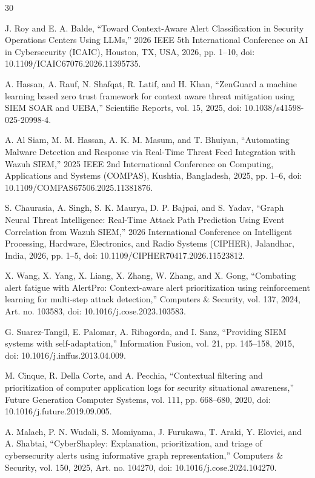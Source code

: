 \documentclass[conference]{IEEEtran}
\begin{document}
\begin{thebibliography}{30}
\scriptsize
\setlength{\itemsep}{0pt}
\setlength{\parskip}{0pt}
\setlength{\parsep}{0pt}

 J. Roy and E. A. Balde, ``Toward Context-Aware Alert Classification in Security Operations Centers Using LLMs,'' 2026 IEEE 5th International Conference on AI in Cybersecurity (ICAIC), Houston, TX, USA, 2026, pp. 1--10, doi: 10.1109/ICAIC67076.2026.11395735.

 A. Hassan, A. Rauf, N. Shafqat, R. Latif, and H. Khan, ``ZenGuard a machine learning based zero trust framework for context aware threat mitigation using SIEM SOAR and UEBA,'' Scientific Reports, vol. 15, 2025, doi: 10.1038/s41598-025-20998-4.

 A. Al Siam, M. M. Hassan, A. K. M. Masum, and T. Bhuiyan, ``Automating Malware Detection and Response via Real-Time Threat Feed Integration with Wazuh SIEM,'' 2025 IEEE 2nd International Conference on Computing, Applications and Systems (COMPAS), Kushtia, Bangladesh, 2025, pp. 1--6, doi: 10.1109/COMPAS67506.2025.11381876.

 S. Chaurasia, A. Singh, S. K. Maurya, D. P. Bajpai, and S. Yadav, ``Graph Neural Threat Intelligence: Real-Time Attack Path Prediction Using Event Correlation from Wazuh SIEM,'' 2026 International Conference on Intelligent Processing, Hardware, Electronics, and Radio Systems (CIPHER), Jalandhar, India, 2026, pp. 1--5, doi: 10.1109/CIPHER70417.2026.11523812.

 X. Wang, X. Yang, X. Liang, X. Zhang, W. Zhang, and X. Gong, ``Combating alert fatigue with AlertPro: Context-aware alert prioritization using reinforcement learning for multi-step attack detection,'' Computers \& Security, vol. 137, 2024, Art. no. 103583, doi: 10.1016/j.cose.2023.103583.

 G. Suarez-Tangil, E. Palomar, A. Ribagorda, and I. Sanz, ``Providing SIEM systems with self-adaptation,'' Information Fusion, vol. 21, pp. 145--158, 2015, doi: 10.1016/j.inffus.2013.04.009.

 M. Cinque, R. Della Corte, and A. Pecchia, ``Contextual filtering and prioritization of computer application logs for security situational awareness,'' Future Generation Computer Systems, vol. 111, pp. 668--680, 2020, doi: 10.1016/j.future.2019.09.005.

 A. Malach, P. N. Wudali, S. Momiyama, J. Furukawa, T. Araki, Y. Elovici, and A. Shabtai, ``CyberShapley: Explanation, prioritization, and triage of cybersecurity alerts using informative graph representation,'' Computers \& Security, vol. 150, 2025, Art. no. 104270, doi: 10.1016/j.cose.2024.104270.


\end{thebibliography}
\end{document}

